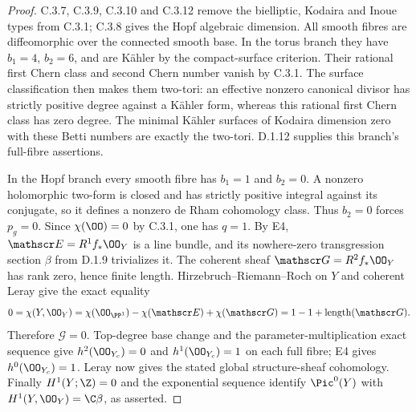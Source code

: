 \begin{proof}
C.3.7, C.3.9, C.3.10 and C.3.12 remove the bielliptic,
Kodaira and Inoue types from C.3.1; C.3.8 gives the Hopf algebraic
dimension. All smooth fibres are diffeomorphic over the
connected smooth base. In the torus branch they have
$b_1=4$, $b_2=6$, and are K\"ahler by the compact-surface
criterion. Their rational first Chern class and second
Chern number vanish by C.3.1. The surface classification
then makes them two-tori: an effective nonzero canonical
divisor has strictly positive degree against a K\"ahler
form, whereas this rational first Chern class has zero
degree. The minimal K\"ahler surfaces of Kodaira dimension
zero with these Betti numbers are exactly the two-tori.
D.1.12 supplies this branch's full-fibre assertions.

In the Hopf branch every smooth fibre has
$b_1=1$ and $b_2=0$. A nonzero holomorphic two-form
is closed and has strictly positive integral against
its conjugate, so it defines a nonzero de Rham
cohomology class. Thus $b_2=0$ forces $p_g=0$.
Since $\chi(\OO)=0$ by C.3.1, one has $q=1$.
By E4, $\mathscr E=R^1f_*\OO_Y$ is a line bundle,
and its nowhere-zero transgression section $\beta$
from D.1.9 trivializes it. The coherent sheaf
$\mathscr G=R^2f_*\OO_Y$ has rank zero, hence finite
length. Hirzebruch--Riemann--Roch on $Y$ and coherent
Leray give the exact equality
\[
 0=\chi(Y,\OO_Y)
   =\chi(\OO_{\PP^1})-\chi(\mathscr E)+\chi(\mathscr G)
   =1-1+\operatorname{length}(\mathscr G).
\]
Therefore $\mathscr G=0$. Top-degree base change and
the parameter-multiplication exact sequence give
$h^2(\OO_{Y_c})=0$ and $h^1(\OO_{Y_c})=1$ on each
full fibre; E4 gives $h^0(\OO_{Y_c})=1$.
Leray now gives the stated global structure-sheaf
cohomology. Finally $H^1(Y;\Z)=0$ and the exponential
sequence identify $\Pic^0(Y)$ with
$H^1(Y,\OO_Y)=\C\beta$, as asserted.
\end{proof}
